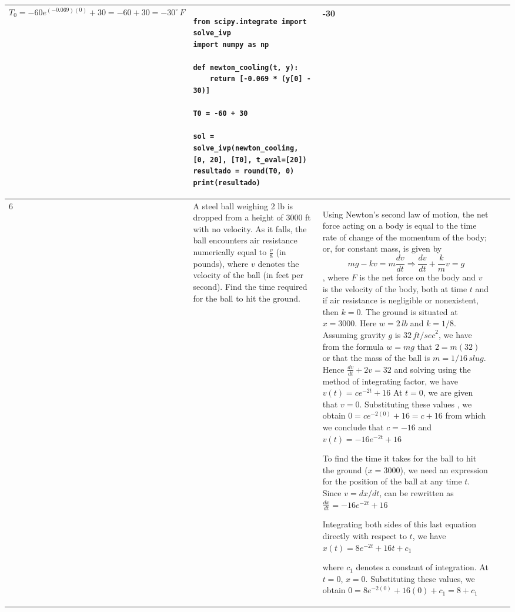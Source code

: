 \documentclass[a4paper,12pt]{article}
\begin{document}
\begin{longtable}{|p{0.3cm}|p{}|p{10cm}|p{}|p{1.5cm}|}
\[
T_0 = -60e^{(-0.069)(0)} + 30 = -60 + 30 = -30^\circ \, F
\]

  &
\begin{verbatim}
from scipy.integrate import solve_ivp
import numpy as np

def newton_cooling(t, y):
    return [-0.069 * (y[0] - 30)]

T0 = -60 + 30

sol = solve_ivp(newton_cooling, [0, 20], [T0], t_eval=[20])
resultado = round(T0, 0)
print(resultado)
\end{verbatim}& -30                \\ \hline
   6              & A steel ball weighing 2 lb is dropped from a height of 3000 ft with no velocity. As it falls, the ball encounters air resistance numerically equal to \( \frac{v}{8} \) (in pounds), where \( v \) denotes the velocity of the ball (in feet per second). Find the time required for the ball to hit the ground.


                & Using Newton’s second law of motion, the net force acting on a body is equal to the time rate of change of the momentum of the body; or, for constant mass, is given by 
\[ mg - kv = m \frac{dv}{dt} \Rightarrow  \frac{dv}{dt} + \frac{k}{m}v = g\],  where \( F \) is the net force on the body and \( v \) is the velocity of the body, both at time \( t \) and if air resistance is negligible or nonexistent, then \( k = 0 \). The ground is situated at \( x = 3000 \). Here \( w = 2 \,lb \) and \( k = 1/8 \). Assuming gravity \( g \) is \( 32 \,{ft/sec}^2 \), we have from the formula \( w = mg \) that \( 2 = m(32) \) or that the mass of the ball is \( m = 1/16 \, slug \). Hence $\frac{dv}{dt} + 2v = 32$ and solving using the method of integrating factor, we have  
$v(t) = ce^{-2t} + 16 $
At \( t = 0 \), we are given that \( v = 0 \). Substituting these values  , we obtain $0 = ce^{-2(0)} + 16 = c + 16$
from which we conclude that \( c = -16 \) and $ v(t) = -16e^{-2t} + 16 $

 To find the time it takes for the ball to hit the ground (\( x = 3000 \)), we need an expression for the position of the ball at any time \( t \). Since \( v = dx/dt \),  can be rewritten as $\frac{dx}{dt} = -16e^{-2t} + 16$

Integrating both sides of this last equation directly with respect to \( t \), we have $x(t) = 8e^{-2t} + 16t + c_1 $

where \( c_1 \) denotes a constant of integration. At \( t = 0 \), \( x = 0 \). Substituting these values, we obtain
$0 = 8e^{-2(0)} + 16(0) + c_1 = 8 + c_1$


\end{longtable}
\end{document}
